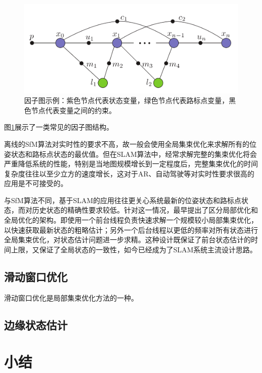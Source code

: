\begin{figure}[htbp]
    \centering
    \includegraphics[width=.6\textwidth]{figs/factor_graph.png}
    \caption{因子图示例\citep{kaess2012isam2}：紫色节点代表状态变量，绿色节点代表路标点变量，黑色节点代表变量之间的约束。}
    \label{fig:factor_graph}
\end{figure}

图\ref{fig:factor_graph}展示了一类常见的因子图结构。

离线的SfM算法对实时性的要求不高，故一般会使用全局集束优化来求解所有的位姿状态和路标点状态的最优值。但在SLAM算法中，经常求解完整的集束优化将会严重降低系统的性能，特别是当地图规模增长到一定程度后，完整集束优化的时间复杂度往往以至少立方的速度增长，这对于AR、自动驾驶等对实时性要求很高的应用是不可接受的。

与SfM算法不同，基于SLAM的应用往往更关心系统最新的位姿状态和路标点状态，而对历史状态的精确性要求较低。针对这一情况，\citep{klein2007parallel}最早提出了区分局部优化和全局优化的架构。即使用一个前台线程负责快速求解一个规模较小局部集束优化，以快速获取最新状态的粗略估计；另外一个后台线程以更低的频率对所有状态进行全局集束优化，对状态估计问题进一步求精。这种设计既保证了前台状态估计的时间上限，又保证了全局状态的一致性，如今已经成为了SLAM系统主流设计思路。

\subsection{滑动窗口优化}

滑动窗口优化是局部集束优化方法的一种。

\subsection{边缘状态估计}

\section{小结}
